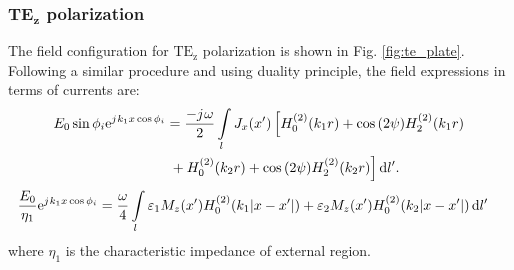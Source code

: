 \subsubsection{$\mathbf{TE_z}$ polarization}
%
The field configuration for $\mathrm{TE_z}$ polarization is shown in Fig. \ref{fig:te_plate}. Following a similar procedure and using duality principle, the field expressions in terms of currents are:
%
\begin{align}
  E_0 \sin \phi_i  \mathrm{e}^{{j}\mkern1mu k_1 x \cos \phi_i} &=  \frac{-{j}\mkern1mu \omega}{2} \int\limits_{l} J_x(x') \left[ H_0^{(2)}(k_1 r) + \cos {(2 \psi)} H_2^{(2)}(k_1 r) \right. \notag\\
  & \left. {} + H_0^{(2)}(k_2 r) + \cos {(2\psi)} H_2^{(2)}(k_2 r)\right]\mathop{}\!\mathrm{d}{l'}.
  \label{eq:J_final}
\end{align}
%
\begin{align}
  \frac{E_0}{\eta_1} \mathrm{e}^{{j}\mkern1mu k_1 x \cos \phi_i} &=  \frac{\omega}{4} \int\limits_{l} \varepsilon_1 M_z(x') H_0^{(2)}(k_1 |x - x'|)  +  \varepsilon_2 M_z(x') H_0^{(2)}(k_2 |x - x'|) \mathop{}\!\mathrm{d}{l'}
  \label{eq:scalarH_final}
\end{align}
%
where $\eta_1$ is the characteristic impedance of external region.
